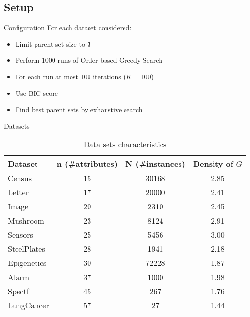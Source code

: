 \subsection{Setup}
	\begin{frame}{Configuration}
		For each dataset considered:
		\begin{itemize}
			\item Limit parent set size to 3
			\item Perform 1000 runs of Order-based Greedy Search
			\item For each run at most 100 iterations ($K = 100$)
			\item Use BIC score
			\item Find best parent sets by exhaustive search
		\end{itemize}
	\end{frame}
	\begin{frame}{Datasets}
		\begin{table}
			\centering
			\begin{tabular}{ | l | c | c | c | }
				\hline
				Dataset & n (\#attributes) & N (\#instances) & Density of $\overline G$ \\ \hline
				Census & 15 & 30168 & 2.85 \\ \hline
				Letter & 17 & 20000 & 2.41 \\ \hline
				Image & 20 & 2310 & 2.45 \\ \hline
				Mushroom & 23 & 8124 & 2.91 \\ \hline
				Sensors & 25 & 5456 & 3.00 \\ \hline
				SteelPlates & 28 & 1941 & 2.18 \\ \hline
				Epigenetics & 30 & 72228 & 1.87 \\ \hline
				Alarm & 37 & 1000 & 1.98 \\ \hline
				Spectf & 45 & 267 & 1.76 \\ \hline
				LungCancer & 57 & 27 & 1.44 \\ \hline
			\end{tabular}
			\caption{Data sets characteristics}
			\label{tab:datasets}
		\end{table}
	\end{frame}
